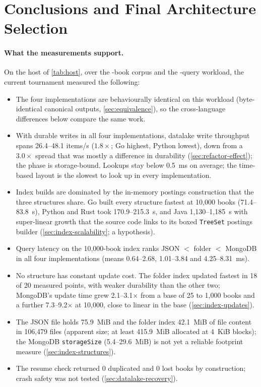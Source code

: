 \section{Conclusions and Final Architecture Selection}
\label{sec:conclusions}

\paragraph{What the measurements support.}
On the host of \cref{tab:host}, over the -book corpus and the
-query workload, the current tournament measured the following:

\begin{itemize}
    \item The four implementations are behaviourally identical on this
    workload (byte-identical canonical outputs, \cref{sec:equivalence}), so
    the cross-language differences below compare the same work.
    \item With durable writes in all four implementations, datalake write
    throughput spans 26.4--48.1 items/s ($1.8\times$; Go highest, Python
    lowest), down from a $3.0\times$ spread that was mostly a difference in
    durability (\cref{sec:refactor-effect}); the phase is storage-bound.
    Lookups stay below 0.5~ms on average; the time-based layout is the
    slowest to look up in every implementation.
    \item Index builds are dominated by the in-memory postings construction
    that the three structures share. Go built every structure fastest at
    10{,}000 books (71.4--83.8~s), Python and Rust took 170.9--215.3~s, and
    Java 1{,}130--1{,}185~s with super-linear growth that the source code
    links to its boxed \texttt{TreeSet} postings builder
    (\cref{sec:index-scalability}; a hypothesis).
    \item Query latency on the 10{,}000-book index ranks JSON $<$ folder $<$
    MongoDB in all four implementations (means 0.64--2.68, 1.01--3.84 and
    4.25--8.31~ms).
    \item No structure has constant update cost. The folder index updated
    fastest in 18 of 20 measured points, with weaker durability than the
    other two; MongoDB's update time grew 2.1--3.1$\times$ from a base of 25
    to 1{,}000 books and a further 7.3--9.2$\times$ at 10{,}000, close to
    linear in the base (\cref{sec:index-updates}).
    \item The JSON file holds 75.9~MiB and the folder index 42.1~MiB of file
    content in 106{,}479 files (apparent size; at least 415.9~MiB allocated
    at 4~KiB blocks); the MongoDB \texttt{storageSize} (5.4--29.6~MiB) is
    not yet a reliable footprint measure (\cref{sec:index-structures}).
    \item The resume check returned 0 duplicated and 0 lost books by
    construction; crash safety was not tested (\cref{sec:datalake-recovery}).
\end{itemize}

